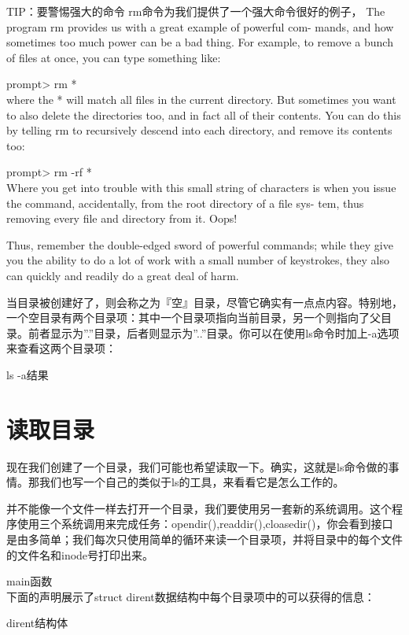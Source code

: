 TIP：要警惕强大的命令
rm命令为我们提供了一个强大命令很好的例子，
The program rm provides us with a great example of powerful com- mands, and how sometimes too much power can be a bad thing. For example, to remove a bunch of files at once, you can type something like:

prompt> rm *\\

where the * will match all files in the current directory. But sometimes you want to also delete the directories too, and in fact all of their contents. You can do this by telling rm to recursively descend into each directory, and remove its contents too:

prompt> rm -rf *\\

Where you get into trouble with this small string of characters is when you issue the command, accidentally, from the root directory of a file sys- tem, thus removing every file and directory from it. Oops!

Thus, remember the double-edged sword of powerful commands; while they give you the ability to do a lot of work with a small number of keystrokes, they also can quickly and readily do a great deal of harm.


当目录被创建好了，则会称之为『空』目录，尽管它确实有一点点内容。特别地，一个空目录有两个目录项：其中一个目录项指向当前目录，另一个则指向了父目录。前者显示为”.”目录，后者则显示为”..”目录。你可以在使用ls命令时加上-a选项来查看这两个目录项：

ls -a结果\\

\section{读取目录}
现在我们创建了一个目录，我们可能也希望读取一下。确实，这就是ls命令做的事情。那我们也写一个自己的类似于ls的工具，来看看它是怎么工作的。

并不能像一个文件一样去打开一个目录，我们要使用另一套新的系统调用。这个程序使用三个系统调用来完成任务：opendir(),readdir(),cloasedir()，你会看到接口是由多简单；我们每次只使用简单的循环来读一个目录项，并将目录中的每个文件的文件名和inode号打印出来。

main函数\\

下面的声明展示了struct dirent数据结构中每个目录项中的可以获得的信息：

dirent结构体\\

